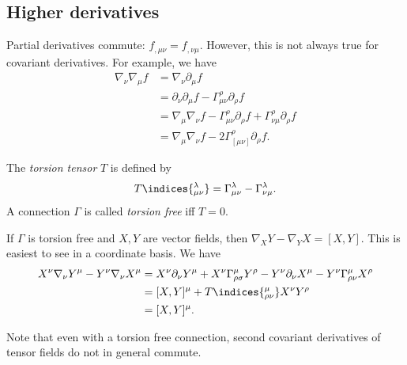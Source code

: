 \documentclass{jknotes}
\begin{document}
\subsection{Higher derivatives}
Partial derivatives commute: \(f_{,\mu\nu} = f_{,\nu\mu}\). However, this is not always true for covariant derivatives. For example, we have
\begin{align}
    \nabla_\nu\nabla_\mu f &= \nabla_\nu\partial_\mu f \\
                           &= \partial_\nu\partial_\mu f - \Gamma^\rho_{\mu\nu}\partial_\rho f \\
                           &= \nabla_\mu\nabla_\nu f - \Gamma^\rho_{\mu\nu}\partial_\rho f + \Gamma^\rho_{\nu\mu}\partial_\rho f \\
                           &= \nabla_\mu\nabla_\nu f - 2 \Gamma^\rho_{[\mu\nu]} \partial_\rho f.
\end{align}

\begin{defn}
    The \emph{torsion tensor} \(T\) is defined by
    \begin{equation}
        T\indices{_{\mu\nu}^\lambda} = \Gamma^\lambda_{\mu\nu} - \Gamma^\lambda_{\nu\mu}.
    \end{equation}
    A connection \(\Gamma\) is called \emph{torsion free} iff \(T=0\).
\end{defn}

If \(\Gamma\) is torsion free and \(X,Y\) are vector fields, then \(\nabla_X Y - \nabla_Y X = [X,Y]\).
This is easiest to see in a coordinate basis. We have
\begin{align}
    X^\nu\nabla_\nu Y^\mu - Y^\nu\nabla_\nu X^\mu &= X^\nu\partial_\nu Y^\mu + X^\nu \Gamma^\mu_{\rho\sigma}Y^\rho - Y^\nu \partial_\nu X^\mu - Y^\nu \Gamma^\mu_{\rho\nu}X^\rho \\
                                                  &= [X,Y]^\mu + T\indices{^\mu_{\rho\nu}} X^\nu Y^\rho \\
                                                  &= [X,Y]^\mu.
\end{align}

Note that even with a torsion free connection, second covariant derivatives of tensor fields do not in general commute.
\end{document}

